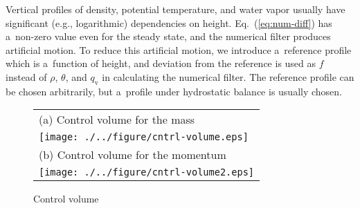 Vertical profiles of density, potential temperature, and water vapor usually have significant (e.g., logarithmic) dependencies on height.
Eq.~(\ref{eq:num-diff}) has a~non-zero value even for the steady state, and the numerical filter produces artificial motion.
To reduce this artificial motion, we introduce a~reference profile which is a~function of height, and deviation from the reference is used as $f$ instead of $\rho$, $\theta$, and $q_{\mathrm{v}}$ in calculating the numerical filter.
The reference profile can be chosen arbitrarily, but a~profile under hydrostatic balance is usually chosen.





\begin{figure}[t]
\begin{center}
  \begin{tabular}{l}
    (a) Control volume for the mass\\
  \texttt{[image: ./../figure/cntrl-volume.eps]}\\
    (b) Control volume for the momentum\\
  \texttt{[image: ./../figure/cntrl-volume2.eps]}\\
  \end{tabular}
\end{center}
  \caption{Control volume}
  \label{fig:cntrl-volume}
\end{figure}
